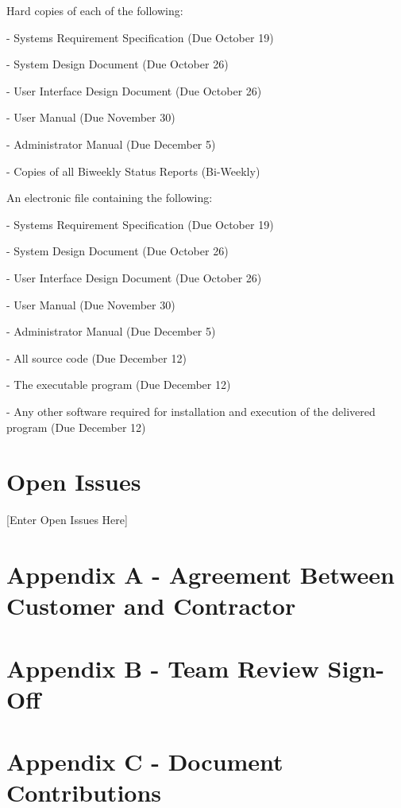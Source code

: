 \documentclass{article}
\begin{document}
Hard copies of each of the following:

\vspace{2.5mm}

-  Systems Requirement Specification (Due October 19)

-   System Design Document (Due October 26)

-   User Interface Design Document (Due October 26)

-   User Manual (Due November 30)

-   Administrator Manual (Due December 5)

-   Copies of all Biweekly Status Reports (Bi-Weekly)

\vspace{5mm}

An electronic file containing the following: 

\vspace{2.5mm}

-   Systems Requirement Specification (Due October 19)

-   System Design Document (Due October 26)

-   User Interface Design Document (Due October 26)

-   User Manual (Due November 30)

-   Administrator Manual (Due December 5)

-   All source code (Due December 12)

-   The executable program (Due December 12)

-   Any other software required for installation and execution of the delivered program (Due December 12)




\section{Open Issues}\label{sec:openIssues}

\vspace{2.5mm}

\begin{addmargin}[4em]{0em}

[Enter Open Issues Here]

\end{addmargin}

\vspace{2.5mm}




\section{Appendix A - Agreement Between Customer and Contractor}\label{sec:apendixA}




\section{Appendix B - Team Review Sign-Off}\label{sec:appendixB}




\section{Appendix C - Document Contributions}\label{sec:appendixC}
\end{document}
